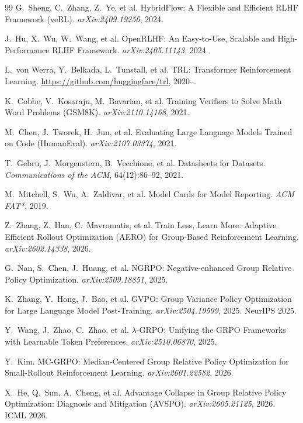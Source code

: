 \documentclass[12pt,a4paper]{report}
\begin{document}
\begin{thebibliography}{99}
G.~Sheng, C.~Zhang, Z.~Ye, et al.
\newblock HybridFlow: A Flexible and Efficient RLHF Framework (veRL).
\newblock \emph{arXiv:2409.19256}, 2024.

J.~Hu, X.~Wu, W.~Wang, et al.
\newblock OpenRLHF: An Easy-to-Use, Scalable and High-Performance RLHF Framework.
\newblock \emph{arXiv:2405.11143}, 2024.

L.~von Werra, Y.~Belkada, L.~Tunstall, et al.
\newblock TRL: Transformer Reinforcement Learning.
\newblock \url{https://github.com/huggingface/trl}, 2020--.

K.~Cobbe, V.~Kosaraju, M.~Bavarian, et al.
\newblock Training Verifiers to Solve Math Word Problems (GSM8K).
\newblock \emph{arXiv:2110.14168}, 2021.

M.~Chen, J.~Tworek, H.~Jun, et al.
\newblock Evaluating Large Language Models Trained on Code (HumanEval).
\newblock \emph{arXiv:2107.03374}, 2021.

T.~Gebru, J.~Morgenstern, B.~Vecchione, et al.
\newblock Datasheets for Datasets.
\newblock \emph{Communications of the ACM}, 64(12):86--92, 2021.

M.~Mitchell, S.~Wu, A.~Zaldivar, et al.
\newblock Model Cards for Model Reporting.
\newblock \emph{ACM FAT*}, 2019.

Z.~Zhang, Z.~Han, C.~Mavromatis, et al.
\newblock Train Less, Learn More: Adaptive Efficient Rollout Optimization (AERO) for Group-Based Reinforcement Learning.
\newblock \emph{arXiv:2602.14338}, 2026.

G.~Nan, S.~Chen, J.~Huang, et al.
\newblock NGRPO: Negative-enhanced Group Relative Policy Optimization.
\newblock \emph{arXiv:2509.18851}, 2025.

K.~Zhang, Y.~Hong, J.~Bao, et al.
\newblock GVPO: Group Variance Policy Optimization for Large Language Model Post-Training.
\newblock \emph{arXiv:2504.19599}, 2025. NeurIPS 2025.

Y.~Wang, J.~Zhao, C.~Zhao, et al.
\newblock $\lambda$-GRPO: Unifying the GRPO Frameworks with Learnable Token Preferences.
\newblock \emph{arXiv:2510.06870}, 2025.

Y.~Kim.
\newblock MC-GRPO: Median-Centered Group Relative Policy Optimization for Small-Rollout Reinforcement Learning.
\newblock \emph{arXiv:2601.22582}, 2026.

X.~He, Q.~Sun, A.~Cheng, et al.
\newblock Advantage Collapse in Group Relative Policy Optimization: Diagnosis and Mitigation (AVSPO).
\newblock \emph{arXiv:2605.21125}, 2026. ICML 2026.

\end{thebibliography}
\end{document}
